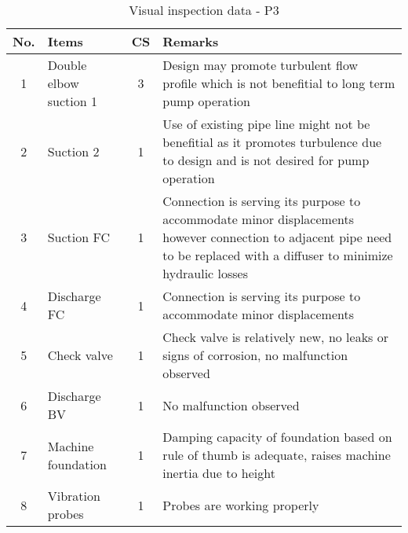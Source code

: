 \begin{table}[!htb]
	\caption{Visual inspection data - P3}
	\label{ch043_tbl_visualinspectionP3}
		{\scriptsize
\begin{tabular}{c|l|c|p{9.5cm}}
	\hline
	No. & Items & CS & Remarks \\ 

\hline
1 & Double elbow suction 1 & 3 & Design may promote turbulent flow profile which is not benefitial to long term pump operation \\ 
2 & Suction 2 & 1 & Use of existing pipe line might not be benefitial as it promotes turbulence due to design and is not desired for pump operation \\ 
3 & Suction FC & 1 & Connection is serving its purpose to accommodate minor displacements however connection to adjacent pipe need to be replaced with a diffuser to minimize hydraulic losses\\ 
4 & Discharge FC & 1 & Connection is serving its purpose to accommodate minor displacements \\ 
5 & Check valve & 1 & Check valve is relatively new, no leaks or signs of corrosion, no malfunction observed \\ 
6 & Discharge BV & 1 & No malfunction observed \\ 
7 & Machine foundation & 1 & Damping capacity of foundation based on rule of thumb is adequate, raises machine inertia due to height  \\ 
8 & Vibration probes & 1 & Probes are working properly \\ 
\hline
\end{tabular}
	}
\end{table}